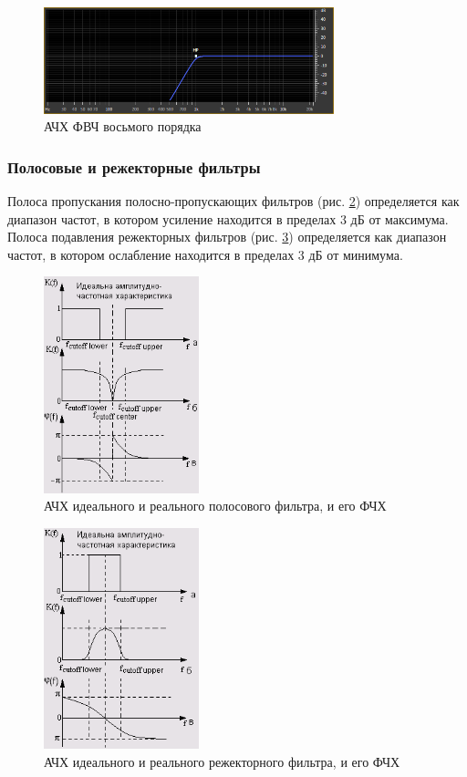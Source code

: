 \documentclass[oneside, final, 14pt]{extreport}
\begin{document}
\begin{figure}[h!]
  \centering
  \includegraphics[width=0.75\textwidth]{pic-filter-06}
  \caption{АЧХ ФВЧ восьмого порядка}
  \label{pic-filter-06}
\end{figure}

\subsubsection{Полосовые и режекторные фильтры}
Полоса пропускания полосно-пропускающих фильтров (рис. \ref{pic-filter-03}) определяется как диапазон частот, в котором усиление находится в пределах 3 дБ от максимума. Полоса подавления режекторных фильтров (рис. \ref{pic-filter-04}) определяется как диапазон частот, в котором ослабление находится в пределах 3 дБ от минимума.

\begin{figure}[h!]
  \centering
  \includegraphics[width=0.4\textwidth]{pic-filter-03}
  \caption{АЧХ идеального и реального полосового фильтра, и его ФЧХ}
  \label{pic-filter-03}
\end{figure}

\begin{figure}[h!]
  \centering
  \includegraphics[width=0.4\textwidth]{pic-filter-04}
  \caption{АЧХ идеального и реального режекторного фильтра, и его ФЧХ}
  \label{pic-filter-04}
\end{figure}
\end{document}
